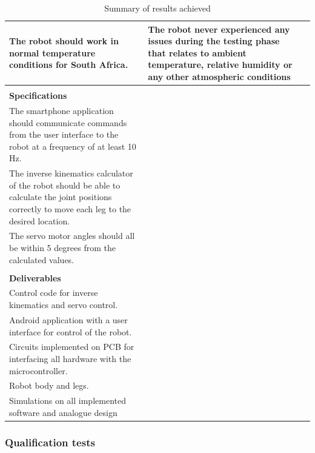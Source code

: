 \begin{table}[H]
\begin{tabular}{|p{5cm}|p{5cm}|p{5cm}|}
The robot should work in normal temperature conditions for South Africa.&The robot never experienced any issues during the testing phase that relates to ambient temperature, relative humidity or any other atmospheric conditions&\\\hline

\multicolumn{3}{|l|}{}\\
\multicolumn{3}{|l|}{\textbf{Specifications}}\\
\hline
The smartphone application should communicate commands from the user interface to the robot at a frequency of at least 10 Hz.&&\\\hline

The inverse kinematics calculator of the robot should be able to calculate the joint positions correctly to move each leg to the desired location.&&\\\hline

The servo motor angles should all be within 5 degrees from the calculated values.&&\\\hline

\multicolumn{3}{|l|}{}\\
\multicolumn{3}{|l|}{\textbf{Deliverables}}\\
\hline
Control code for inverse kinematics and servo control.&&\\\hline

Android application with a user interface for control of the robot.&&\\\hline

Circuits implemented on PCB for interfacing all hardware with the microcontroller.&&\\\hline

Robot body and legs.&&\\\hline

Simulations on all implemented software and analogue design&&\\\hline

\end{tabular}
\caption{Summary of results achieved}
\label{my-label}
\end{table}

\subsubsection{Qualification tests}

